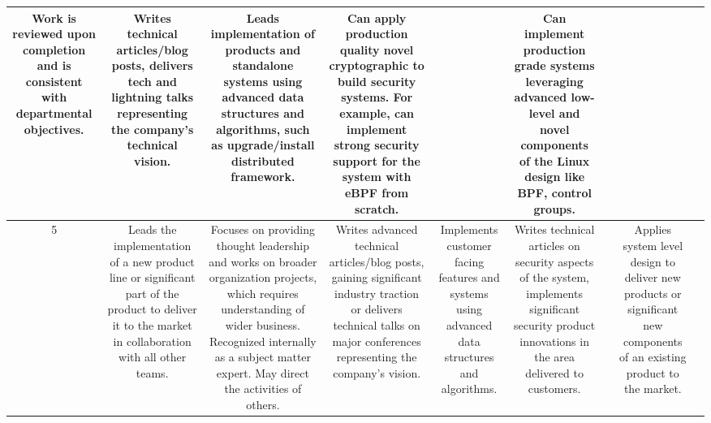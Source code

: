 \documentclass{article}
\begin{document}
{\begin{tabular}{|C|C|C|C|C|C|C|C|C|}
    Work is reviewed upon completion and is consistent with departmental
    objectives.
    &

    Writes technical articles/blog posts, delivers tech and lightning talks
    representing the company's technical vision.
    &

    Leads implementation of products and standalone systems using advanced data
    structures and algorithms, such as upgrade/install distributed framework.
    &

    Can apply production quality novel cryptographic to build security systems.
    For example, can implement strong security support for the system with eBPF
    from scratch.
    &

    &

    Can implement production grade systems leveraging advanced low-level and
    novel components of the Linux design like BPF, control groups.
    &

    \\ [13em]
  \hline
    5
    &

    Leads the implementation of a new product line or significant part of the
    product to deliver it to the market in collaboration with all other teams.
    &

    Focuses on providing thought leadership and works on broader organization
    projects, which requires understanding of wider business. Recognized
    internally as a subject matter expert. May direct the activities of others.
    &

    Writes advanced technical articles/blog posts, gaining significant industry
    traction or delivers technical talks on major conferences representing the
    company's vision.
    &

    Implements customer facing features and systems using advanced data
    structures and algorithms.
    &

    Writes technical articles on security aspects of the system, implements
    significant security product innovations in the area delivered to customers.
    &

    &

    Applies system level design to deliver new products or significant new
    components of an existing product to the market.
    &


\end{tabular}}
\end{document}
